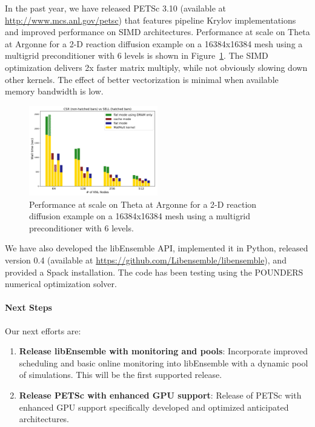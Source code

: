 In the past year, we have released PETSc 3.10 (available at \url{http://www.mcs.anl.gov/petsc})
that features pipeline Krylov implementations and improved performance on SIMD
architectures.  Performance at scale on Theta at Argonne for a 2-D reaction 
diffusion example on a 16384x16384 mesh using a multigrid preconditioner with 
6 levels is shown in Figure~\ref{fig:petsc-tao-fig}. The SIMD optimization 
delivers 2x faster matrix multiply, while not obviously slowing down other 
kernels.  The effect of better vectorization is minimal when available 
memory bandwidth is low.

\begin{figure}
\centering
\includegraphics[width=0.5\textwidth]{projects/2.3.3-MathLibs/2.3.3.06-PETSc-TAO/aij_vs_sell}
\caption{Performance at scale on Theta at Argonne for a 2-D reaction diffusion 
example on a 16384x16384 mesh using a multigrid preconditioner with 
6 levels.}
\label{fig:petsc-tao-fig}
\end{figure}

We have also developed the libEnsemble API, implemented it in Python, released 
version 0.4 (available at \url{https://github.com/Libensemble/libensemble}),
and provided a Spack installation.  The code has been testing using the
POUNDERS numerical optimization solver.

\paragraph{Next Steps}

Our next efforts are:
\begin{enumerate}
  \item \textbf{Release libEnsemble with monitoring and pools}: Incorporate improved scheduling 
    and basic online monitoring into libEnsemble with a dynamic pool of simulations.  This will
    be the first supported release.
  \item \textbf{Release PETSc with enhanced GPU support}: Release of PETSc with enhanced GPU 
    support specifically developed and optimized anticipated architectures.
\end{enumerate}

